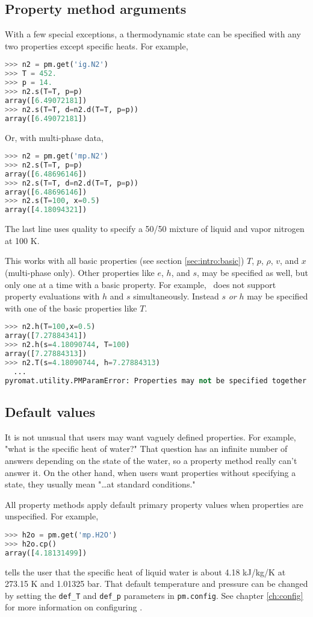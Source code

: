 \subsection{Property method arguments}

With a few special exceptions, a thermodynamic state can be specified with any two properties except specific heats.  For example,
\begin{lstlisting}[language=Python]
>>> n2 = pm.get('ig.N2')
>>> T = 452.
>>> p = 14.
>>> n2.s(T=T, p=p)
array([6.49072181])
>>> n2.s(T=T, d=n2.d(T=T, p=p))
array([6.49072181])
\end{lstlisting}
Or, with multi-phase data,
\begin{lstlisting}[language=Python]
>>> n2 = pm.get('mp.N2')
>>> n2.s(T=T, p=p)
array([6.48696146])
>>> n2.s(T=T, d=n2.d(T=T, p=p))
array([6.48696146])
>>> n2.s(T=100, x=0.5)
array([4.18094321])
\end{lstlisting}
The last line uses quality to specify a 50/50 mixture of liquid and vapor nitrogen at 100 K.

This works with all basic properties (see section \ref{sec:intro:basic}) $T$, $p$, $\rho$, $v$, and $x$ (multi-phase only).  Other properties like $e$, $h$, and $s$, may be specified as well, but only one at a time with a basic property.  For example, \PM\ does not support property evaluations with $h$ and $s$ simultaneously.  Instead $s$ \emph{or} $h$ may be specified with one of the basic properties like $T$.
\begin{lstlisting}[language=Python]
>>> n2.h(T=100,x=0.5)
array([7.27884341])
>>> n2.h(s=4.18090744, T=100)
array([7.27884313])
>>> n2.T(s=4.18090744, h=7.27884313)
  ...
pyromat.utility.PMParamError: Properties may not be specified together: s, h
\end{lstlisting}


\subsection{Default values}

It is not unusual that users may want vaguely defined properties.  For example, "what is the specific heat of water?"  That question has an infinite number of answers depending on the state of the water, so a property method really can't answer it.  On the other hand, when users want properties without specifying a state, they usually mean "\ldots at standard conditions."

All property methods apply default primary property values when properties are unspecified.  For example,
\begin{lstlisting}[language=Python]
>>> h2o = pm.get('mp.H2O')
>>> h2o.cp()
array([4.18131499])
\end{lstlisting}
tells the user that the specific heat of liquid water is about 4.18 kJ/kg/K at 273.15 K and 1.01325 bar.  That default temperature and pressure can be changed by setting the \verb|def_T| and \verb|def_p| parameters in \texttt{pm.config}.  See chapter \ref{ch:config} for more information on configuring \PM.

